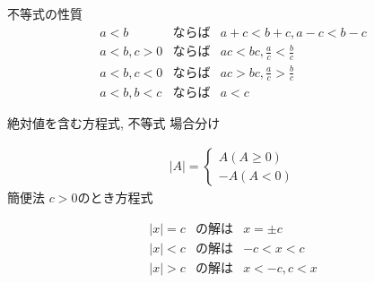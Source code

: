 \documentclass[aspectratio=169, 12pt]{beamer}
\begin{document}
\begin{frame}{不等式の性質}
    \begin{eqnarray*}
        a<b&ならば&a+c<b+c, a-c<b-c \\
        a<b, c>0&ならば&ac<bc, \frac{a}{c}<\frac{b}{c} \\
        a<b, c<0&ならば&ac>bc, \frac{a}{c}>\frac{b}{c} \\
        a<b, b<c&ならば&a<c
    \end{eqnarray*}
\end{frame}
\begin{frame}{絶対値を含む方程式, 不等式}
    場合分け\par
    \begin{eqnarray*}
        |A|=
        \begin{cases}
            A (A\geq 0) \\
            -A (A < 0)
        \end{cases}
    \end{eqnarray*}
    簡便法 $c>0$のとき方程式 \par
    \begin{eqnarray*}
        |x|=c&の解は&x=\pm c \\
        |x|<c&の解は&-c<x<c \\
        |x|>c&の解は&x<-c, c<x
    \end{eqnarray*}
\end{frame}
\end{document}

